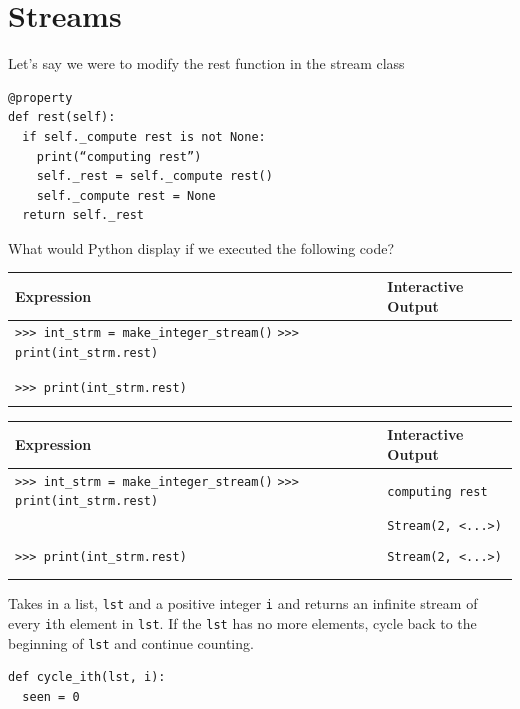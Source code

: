 \documentclass{exam}
\begin{document}
\section{Streams}
\begin{questions}
\item Let's say we were to modify the rest function in the stream class
\begin{lstlisting}
@property 
def rest(self):
  if self._compute rest is not None: 
    print(“computing rest”)
    self._rest = self._compute rest() 
    self._compute rest = None 
  return self._rest
\end{lstlisting}

What would Python display if we executed the following code?
\begin{center}
    \begin{tabular}{|m{9.2cm}|m{6cm}|}
\hline
\textbf{Expression} & \textbf{Interactive Output} \\
\hline
\lstinline$>>> int_strm = make_integer_stream()$
 \lstinline$>>> print(int_strm.rest)$ & \\
 & \\ & \\
\hline
\lstinline$>>> print(int_strm.rest)$ & \\ & \\
\hline
\end{tabular}
\end{center}

\begin{solution}
\begin{center}
    \begin{tabular}{|m{9cm}|m{6cm}|}
\hline
\textbf{Expression} & \textbf{Interactive Output} \\
\hline
\lstinline$>>> int_strm = make_integer_stream()$
 \lstinline$>>> print(int_strm.rest)$ & \color{red}\lstinline$computing rest$ \\
 & \color{red}\lstinline$Stream(2, <...>)$ \\ & \\
\hline
\lstinline$>>> print(int_strm.rest)$ & \color{red}\lstinline$Stream(2, <...>)$ \\ & \\ & \\
\hline
\end{tabular}
\end{center}
\end{solution}

\item Takes in a list, \texttt{lst} and a positive integer \texttt{i} and returns an infinite stream of every \texttt{i}th element in \texttt{lst}. If the \texttt{lst} has no more elements, cycle back to the beginning of \texttt{lst} and continue counting. 
\begin{lstlisting}
def cycle_ith(lst, i):
  seen = 0


\end{lstlisting}
\end{questions}
\end{document}
